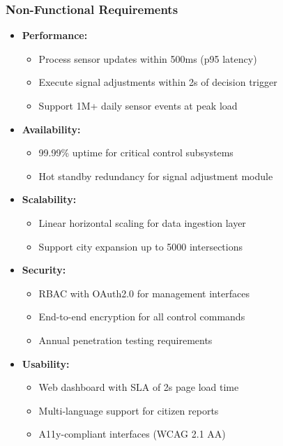 \documentclass[11.5pt]{article}
\begin{document}
    \subsubsection{Non-Functional Requirements}
    \begin{itemize}
        \item \textbf{Performance:}
        \begin{itemize}
            \item Process sensor updates within 500ms (p95 latency)
            \item Execute signal adjustments within 2s of decision trigger
            \item Support 1M+ daily sensor events at peak load
        \end{itemize}
        
        \item \textbf{Availability:}
        \begin{itemize}
            \item 99.99\% uptime for critical control subsystems
            \item Hot standby redundancy for signal adjustment module
        \end{itemize}
        
        \item \textbf{Scalability:}
        \begin{itemize}
            \item Linear horizontal scaling for data ingestion layer
            \item Support city expansion up to 5000 intersections
        \end{itemize}
        
        \item \textbf{Security:}
        \begin{itemize}
            \item RBAC with OAuth2.0 for management interfaces
            \item End-to-end encryption for all control commands
            \item Annual penetration testing requirements
        \end{itemize}
        
        \item \textbf{Usability:}
        \begin{itemize}
            \item Web dashboard with SLA of 2s page load time
            \item Multi-language support for citizen reports
            \item A11y-compliant interfaces (WCAG 2.1 AA)
        \end{itemize}
    \end{itemize}
    
\end{document}
